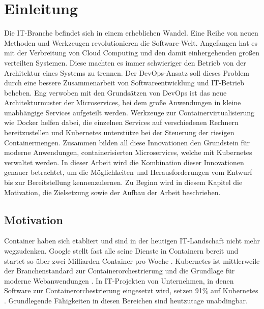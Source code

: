 \section{Einleitung}

\vspace{1em} 

Die IT-Branche befindet sich in einem erheblichen Wandel. Eine Reihe von neuen Methoden und Werkzeugen revolutionieren die Software-Welt. Angefangen hat es mit der Verbreitung von Cloud Computing und den damit einhergehenden großen verteilten Systemen. Diese machten es immer schwieriger den Betrieb von der Architektur eines Systems zu trennen. Der DevOps-Ansatz soll dieses Problem durch eine bessere Zusammenarbeit von Softwareentwicklung und IT-Betrieb beheben. Eng verwoben mit den Grundsätzen von DevOps ist das neue Architekturmuster der Microservices, bei dem große Anwendungen in kleine unabhängige Services aufgeteilt werden. Werkzeuge zur Containervirtualisierung wie Docker helfen dabei, die einzelnen Services auf verschiedenen Rechnern bereitzustellen und Kubernetes unterstütze bei der Steuerung der riesigen Containermengen. Zusammen bilden all diese Innovationen den Grundstein für moderne Anwendungen, containerisierten Microservices, welche mit Kubernetes verwaltet werden. In dieser Arbeit wird die Kombination dieser Innovationen genauer betrachtet, um die Möglichkeiten und Herausforderungen vom Entwurf bis zur Bereitstellung kennenzulernen. Zu Beginn wird in diesem Kapitel die Motivation, die Zielsetzung sowie der Aufbau der Arbeit beschrieben.

\subsection{Motivation}

Container haben sich etabliert und sind in der heutigen IT-Landschaft nicht mehr wegzudenken. Google stellt fast alle seine Dienste in Containern bereit und startet so über zwei Milliarden Container pro Woche \parencite[vgl.][S. 43]{liebelSkalierbare2021}. Kubernetes ist mittlerweile der Branchenstandard zur Containerorchestrierung und die Grundlage für moderne Webanwendungen \parencite[vgl.][Vorwort]{arundelCloud2019}. In IT-Projekten von Unternehmen, in denen Software zur Containerorchestrierung eingesetzt wird, setzen 91\% auf Kubernetes \parencite[vgl.][S. 8]{cloudnativecomputingfoundationCloud2020}. Grundlegende Fähigkeiten in diesen Bereichen sind heutzutage unabdingbar.

